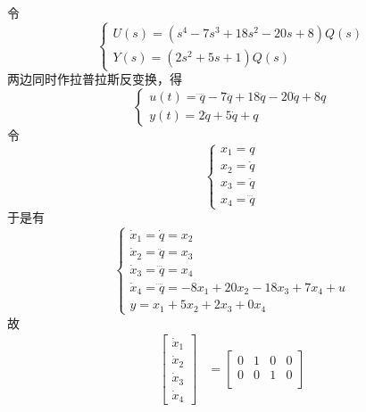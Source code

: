 \begin{exercise} %
    令
    \begin{equation*}
        \begin{cases}
            U(s) = (s^4 - 7s^3 + 18s^2 - 20s + 8) Q(s) \\
            Y(s) = (2s^2 + 5s + 1) Q(s)
        \end{cases}
    \end{equation*}
    两边同时作拉普拉斯反变换，得
    \begin{equation*}
        \begin{cases}
            u(t) = \ddddot{q} - 7\dddot{q} + 18\ddot{q} - 20\dot{q} + 8q \\
            y(t) = 2\ddot{q} + 5\dot{q} + q
        \end{cases}
    \end{equation*}
    令
    \begin{equation*}
        \begin{cases}
            x_1 = q \\
            x_2 = \dot{q} \\
            x_3 = \ddot{q} \\
            x_4 = \dddot{q}
        \end{cases}
    \end{equation*}
    于是有
    \begin{equation*}
        \begin{cases}
            \dot{x}_1 = \dot{q} = x_2 \\
            \dot{x}_2 = \ddot{q} = x_3 \\
            \dot{x}_3 = \dddot{q} = x_4 \\
            \dot{x}_4 = \ddddot{q} = -8x_1 + 20x_2 - 18x_3 + 7x_4 + u \\
            y = x_1 + 5x_2 + 2x_3 + 0x_4
        \end{cases}
    \end{equation*}
    故
    \begin{align*}
        \begin{bmatrix}
            \dot{x}_1 \\
            \dot{x}_2 \\
            \dot{x}_3 \\
            \dot{x}_4
        \end{bmatrix} &= \begin{bmatrix}
            0 & 1 & 0 & 0 \\
            0 & 0 & 1 & 0 \\

\end{bmatrix}
\end{align*}
\end{exercise}
